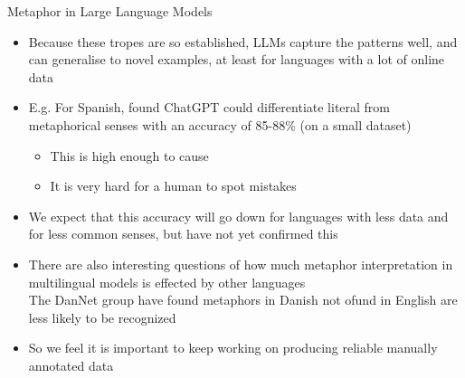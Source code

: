 \documentclass[dvipsnames]{beamer}
\begin{document}
\begin{frame}{Metaphor in Large Language Models}
  \begin{itemize}
  \item Because these tropes are so established, LLMs capture the
    patterns well, and can generalise to novel examples, at least for languages with a lot of online data
  \item E.g. For Spanish, \citet{puraivan2024metaphor} found ChatGPT
    could differentiate literal from metaphorical senses with an
    accuracy of 85-88\% (on a small dataset)
    \begin{itemize}
    \item This is high enough to cause 
    \item It is very hard for a human to spot mistakes
    \end{itemize}
  \item We expect that this accuracy will go down for languages with
    less data and for less common senses, but have not yet confirmed
    this
  \item There are also interesting questions of how much metaphor
    interpretation in multilingual models is effected by other languages
    \\ The DanNet group have found metaphors in Danish not ofund in English are less likely to be recognized
  \item So we feel it is important to
    keep working on producing reliable
    manually annotated data
  \end{itemize}%

  
 \end{frame}
\end{document}
